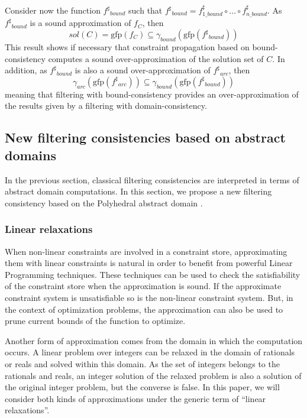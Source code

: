 \documentclass[submission,copyright,creativecommons]{eptcs}
\newcommand{\sh}[1]{\ensuremath{#1^\sharp}}
\newcommand{\gfp}{\ensuremath{\textrm{gfp}}}
\begin{document}
\noindent
Consider now the function $\sh{f}_{bound}$ such that
$\sh{f}_{bound} = \sh{f_{1\_bound}} \circ \ldots \circ \sh{f_{n\_bound}}$. As
$\sh{f}_{bound}$ is a sound approximation of $f_C$, then
$$ sol(C) = \gfp(f_C)  \subseteq \gamma_{bound}(\gfp(\sh{f}_{bound})) $$
This result shows if necessary that constraint propagation based on bound-consistency computes
a sound over-approximation of the solution set of $C$.
In addition, as $\sh{f}_{bound}$ is also a sound over-approximation of $\sh{f}_{arc}$, then 
$$ \gamma_{arc}(\gfp(\sh{f}_{arc})) \subseteq \gamma_{bound}(\gfp(\sh{f}_{bound})) $$
meaning that filtering with bound-consistency provides an over-approximation of the results given by a 
filtering with domain-consistency.
 
\subsection{New filtering consistencies based on abstract domains}
\label{sec:DynaLIB_global}
In the previous section, classical filtering consistencies are interpreted in terms
of abstract domain computations. In this section, we propose a
new filtering consistency based on the Polyhedral abstract domain \cite{CH78}. 

\subsubsection{Linear relaxations}\label{sec:DLRs}

When non-linear constraints are involved in a constraint store, approximating them 
with linear constraints is natural in order to benefit from powerful Linear
Programming techniques. These techniques can be used to check the satisfiability 
of the constraint store when the approximation is sound. If the approximate constraint 
system is unsatisfiable so is the non-linear constraint system. But, in the context
of optimization problems, the approximation
can also be used to prune current bounds of the function to optimize. 

Another form of approximation comes from the domain in which the computation occurs.
A linear problem over integers can be relaxed in the domain of rationals or reals 
and solved within this domain. As the set of integers belongs to the rationals and reals,
an integer solution of the relaxed problem is also a solution of the original integer problem,
but the converse is false. In this paper, we will consider both kinds of approximations 
under the generic term of ``linear relaxations''.
\end{document}
